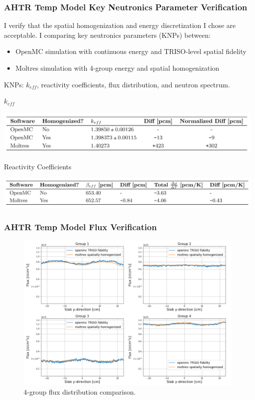 \begin{frame}
    \frametitle{AHTR Temp Model Key Neutronics Parameter Verification}
    I verify that the spatial homogenization and energy discretization I chose are 
    acceptable. I comparing key neutronics parameters (KNPs) between: 
    \begin{itemize} 
        \item OpenMC simulation with continuous energy and TRISO-level spatial fidelity
        \item Moltres simulation with 4-group energy and spatial homogenization
    \end{itemize}
    KNPs: $k_{eff}$, reactivity coefficients, flux distribution, and neutron spectrum. 
    \begin{block}{$k_{eff}$}
        \begin{table}
            \caption{ $k_{eff}$ comparison.}
            \includegraphics[width=0.85\linewidth]{figures/benchmark-keff.png}
        \end{table}
    \end{block}
    \begin{block}{Reactivity Coefficients}
        \begin{table}
            \caption{Reactivity coefficients comparison.}
            \includegraphics[width=0.85\linewidth]{figures/benchmark-coeff.png}
        \end{table}
    \end{block}
\end{frame}

\begin{frame}
    \frametitle{AHTR Temp Model Flux Verification}
    \begin{figure}[]
        \centering
        \includegraphics[width=0.8\linewidth]{figures/benchmark-flux.png} 
        \caption{4-group flux distribution comparison.}
    \end{figure}
\end{frame}

